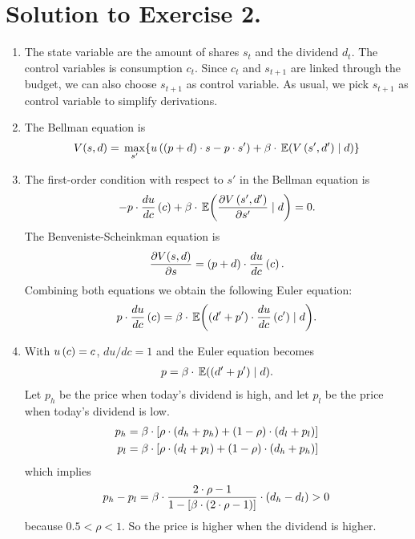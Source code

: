 \documentclass[letterpaper,12pt,leqno]{article}
\begin{document}
\section*{Solution to Exercise 2.}

\begin{enumerate}
\item The state variable are the amount of shares $s_{t}$ and the dividend $d_{t}$.  The
control variables is consumption $c_{t}$. Since $c_{t}$ and $s_{t+1}$ are linked through the budget, we can also choose $s_{t+1}$ as control variable. As usual, we pick $s_{t+1}$ as control variable to simplify derivations.
\item The Bellman equation is 
\begin{align*}
V(s,d) = \max[s']{u\bp{\bp{p+d}\cdot s-p\cdot s'} +\b \cdot\E{V\bp{s',d'} \mid d}}
\end{align*}
\item The first-order condition with respect to $s'$ in the Bellman equation is
\begin{align*}
-p\cdot \od{u}{c}\bp{c} +\b \cdot \E{\pd{V\bp{s',d'}}{s'} \mid d} =0.
\end{align*}
The Benveniste-Scheinkman equation is
\begin{align*}
\frac{\partial V(s,d)}{\partial s} =\left( p+d \right) \cdot \frac{d u}{d c}\left( c \right).
\end{align*}
Combining both equations we obtain the following Euler equation:
\begin{align*}
p\cdot \od{u}{c}\bp{c} =\b \cdot \E{\bp{d'+p'}\cdot  \od{u}{c}\bp{c'} \mid d} .
\end{align*}

\item With $u\left( c \right) =c$, $du/dc=1$ and the Euler equation becomes 
\begin{align*}
p=\b \cdot \E{\bp{d'+p'} \mid d} .
\end{align*}
Let $p_{h}$ be the price when today's dividend is high, and let $p_{l}$ be the price when today's dividend is low.
\begin{align*}
p_{h} &=\beta \cdot \left[ \rho\cdot  \left( d_{h}+p_{h} \right) +\left( 1-\rho \right)\cdot \left( d_{l}+p_{l} \right) \right] \\
p_{l} &=\beta \cdot \left[ \rho \cdot \left( d_{l}+p_{l} \right) +\left( 1-\rho \right)\cdot \left( d_{h}+p_{h} \right) \right]
\end{align*}
which implies
\begin{align*}
p_{h}-p_{l}=\beta\cdot \frac{2\cdot \rho -1 }{1-\left[ \beta \cdot \left( 2\cdot \rho -1 \right) \right]}\cdot \left( d_{h}-d_{l} \right)>0
\end{align*}
because $0.5<\rho<1$. So the price is higher when the dividend is higher.
\end{enumerate}
\end{document}

